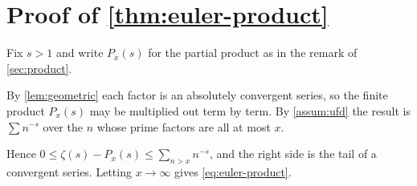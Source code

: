 \section{Proof of \cref{thm:euler-product}}\label{app:proofs}

\eulerproduct*

Fix $s > 1$ and write $P_x(s)$ for the partial product as in the remark of
\cref{sec:product}.

By \cref{lem:geometric} each factor is an absolutely convergent series, so
the finite product $P_x(s)$ may be multiplied out term by term. By
\cref{assum:ufd} the result is $\sum n^{-s}$ over the $n$ whose prime
factors are all at most $x$.

Hence $0 \le \zeta(s) - P_x(s) \le \sum_{n > x} n^{-s}$, and the right
side is the tail of a convergent series. Letting $x \to \infty$ gives
\cref{eq:euler-product}.
